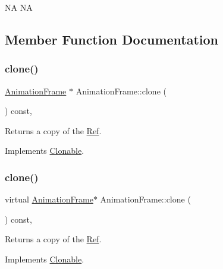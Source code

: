 NA  NA 

\subsection{Member Function Documentation}
\mbox{\label{classAnimationFrame_adaf2f0c5da7138f837b06518daa18a87}} 
\subsubsection{\texorpdfstring{clone()}{clone()}\hspace{0.1cm}{\footnotesize\ttfamily [1/2]}}
{\footnotesize\ttfamily \hyperlink{classAnimationFrame}{Animation\+Frame} $\ast$ Animation\+Frame\+::clone (\begin{DoxyParamCaption}{ }\end{DoxyParamCaption}) const\hspace{0.3cm}{\ttfamily [override]}, {\ttfamily [virtual]}}

Returns a copy of the \hyperlink{classRef}{Ref}. 

Implements \hyperlink{classClonable_a36b05a0fa605f4f269e5884bde7f9e0c}{Clonable}.

\mbox{\label{classAnimationFrame_aa67af008dfdd27d42a61dcf1e77bca02}} 
\subsubsection{\texorpdfstring{clone()}{clone()}\hspace{0.1cm}{\footnotesize\ttfamily [2/2]}}
{\footnotesize\ttfamily virtual \hyperlink{classAnimationFrame}{Animation\+Frame}$\ast$ Animation\+Frame\+::clone (\begin{DoxyParamCaption}{ }\end{DoxyParamCaption}) const\hspace{0.3cm}{\ttfamily [override]}, {\ttfamily [virtual]}}

Returns a copy of the \hyperlink{classRef}{Ref}. 

Implements \hyperlink{classClonable_a36b05a0fa605f4f269e5884bde7f9e0c}{Clonable}.

\mbox{\label{classAnimationFrame_a2ccd019f2a26530692169bc1f186cdc7}} 
